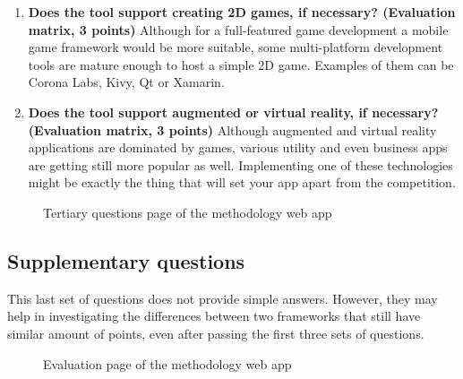 \documentclass[english,master,public,dept460,male,cpdeclaration,oneside]{diploma}
\begin{document}
\begin{enumerate}
	\item \textbf{Does the tool support creating 2D games, if necessary? (Evaluation matrix, 3 points) }
	Although for a full-featured game development a mobile game framework would be more suitable, some multi-platform development tools are mature enough to host a simple 2D game. Examples of them can be Corona Labs, Kivy, Qt or Xamarin.
	
	\item \textbf{Does the tool support augmented or virtual reality, if necessary? (Evaluation matrix, 3 points) }
	Although augmented and virtual reality applications are dominated by games, various utility and even business apps are getting still more popular as well. Implementing one of these technologies might be exactly the thing that will set your app apart from the competition.
\end{enumerate}

\begin{figure}
	\centering{}
	\caption{Tertiary questions page of the methodology web app}
	\label{figure:webMoreQuestions}
\end{figure}

\subsection{Supplementary questions}

This last set of questions does not provide simple answers. However, they may help in investigating the differences between two frameworks that still have similar amount of points, even after passing the first three sets of questions.

\begin{figure}
	\centering{}
	\caption{Evaluation page of the methodology web app}
	\label{figure:webEvaluation}
\end{figure}
\end{document}

